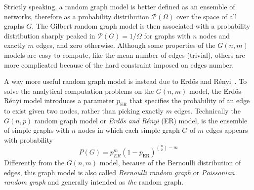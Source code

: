 Strictly speaking, a random graph model is better defined as an ensemble of networks, therefore as a probability distribution $\mathcal{P}(\Omega)$ over the space of all graphs $G$.
The Gilbert random graph model is then associated with a probability distribution sharply peaked in $\mathcal{P}(G)=1/\Omega$ for graphs with $n$ nodes and exactly $m$ edges, and zero otherwise.
Although some properties of the $G(n,m)$ models are easy to compute, like the mean number of edges (trivial), others are more complicated because of the hard constraint imposed on edges number.

A way more useful random graph model is instead due to Erd\H{o}s and Rényi~\cite{erdos1959}. 
To solve the analytical computation problems on the $G(n,m)$ model, the Erd\H{o}s-Rényi model introduces a parameter $p_{\textrm{ER}}$ that specifies the probability of an edge to exist given two nodes, rather than picking exactly $m$ edges.
Technically the $G(n,p)$ random graph model or \emph{Erd\H{o}s and Rényi} (ER) model, is the ensemble of simple graphs with $n$ nodes in which each simple graph $G$ of $m$ edges appears with probability
\begin{equation}
P(G)={p}_{ER}^{m}(1-p_{\textrm{ER}})^{\binom{n}{2}-m}
\end{equation}
Differently from the $G(n,m)$ model, because of the Bernoulli distribution of edges, this graph model is also called \emph{Bernoulli random graph} or \emph{Poissonian random graph} and generally intended as \emph{the} random graph.


